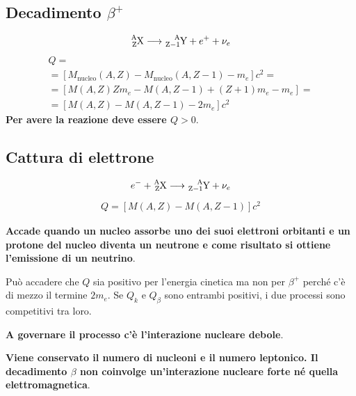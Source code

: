 \documentclass[a4paper,11pt,twoside,openany]{book}
\theoremstyle{definition}
\theoremstyle{plain}
\theoremstyle{plain}
\theoremstyle{definition}
\begin{document}
\subsection{Decadimento $\beta^+$} %
\begin{equation}\begin{split}
\ce{^A_ZX}\longrightarrow \ce{^A_{Z-1}Y}+e^++\nu_e
\end{split}\end{equation}
\begin{equation}\begin{split}
Q=\\
=\left[M_{\textrm{nucleo}}\left(A,Z\right)-M_{\textrm{nucleo}}\left(A,Z-1\right)-m_e\right]c^2=\\
=\left[M\left(A,Z\right)Zm_e-M\left(A,Z-1\right)+\left(Z+1\right)m_e-m_e\right]=\\
=\left[M\left(A,Z\right)-M\left(A,Z-1\right)-2m_e\right]c^2
\end{split}\end{equation}
\textbf{Per avere la reazione deve essere $Q>0$}.

\subsection{Cattura di elettrone} %
\begin{equation}\begin{split}
e^-+\ce{^A_ZX}\longrightarrow \ce{^A_{Z-1}Y}+\nu_e
\end{split}\end{equation}
\begin{equation}\begin{split}
Q=\left[M\left(A,Z\right)-M\left(A,Z-1\right)\right]c^2
\end{split}\end{equation}

\textbf{Accade quando un nucleo assorbe uno dei suoi elettroni orbitanti e un protone del nucleo diventa un neutrone e come risultato si ottiene l’emissione di un neutrino}.

Può accadere che $Q$ sia positivo per l'energia cinetica ma non per $\beta^+$ perché c'è di mezzo il termine $2m_e$. Se $Q_{k}$ e $Q_{\beta}$ sono entrambi positivi, i due processi sono competitivi tra loro.

\textbf{A governare il processo c'è l'interazione nucleare debole}.

\textbf{Viene conservato il numero di nucleoni e il numero leptonico. Il decadimento $\beta$ non coinvolge un'interazione nucleare forte né quella elettromagnetica}.
\end{document}
